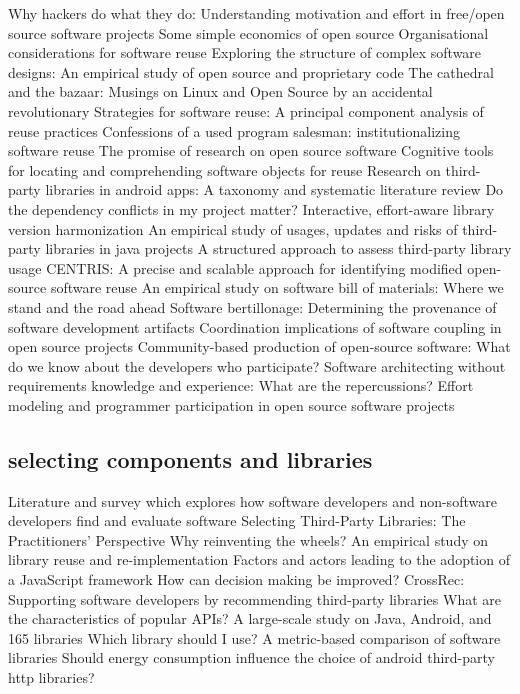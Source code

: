 \citep{Lakhani2003} Why hackers do what they do: Understanding motivation and effort in free/open source software projects
\citep{Lerner2002} Some simple economics of open source
\citep{Lynex1998} Organisational considerations for software reuse
\citep{MacCormack2006} Exploring the structure of complex software designs: An empirical study of open source and proprietary code
\citep{Raymond1999} The cathedral and the bazaar: Musings on Linux and Open Source by an accidental revolutionary
\citep{Rothenberger2003} Strategies for software reuse: A principal component analysis of reuse practices
\citep{Tracz1995} Confessions of a used program salesman: institutionalizing software reuse
\citep{VonKrogh2006} The promise of research on open source software
\citep{Fischer1991} Cognitive tools for locating and comprehending software objects for reuse
\citep{Zhan2021} Research on third-party libraries in android apps: A taxonomy and systematic literature review
\citep{Wang2018} Do the dependency conflicts in my project matter?
\citep{Huang2020} Interactive, effort-aware library version harmonization
\citep{Wang2020} An empirical study of usages, updates and risks of third-party libraries in java projects
\citep{Bauer2012} A structured approach to assess third-party library usage
\citep{Woo2021} CENTRIS: A precise and scalable approach for identifying modified open-source software reuse
\citep{Xia2023} An empirical study on software bill of materials: Where we stand and the road ahead
\citep{Davies2013} Software bertillonage: Determining the provenance of software development artifacts
\citep{Amrit2010} Coordination implications of software coupling in open source projects
\citep{David2008} Community-based production of open-source software: What do we know about the developers who participate?
\citep{Ferrari2008} Software architecting without requirements knowledge and experience: What are the repercussions?
\citep{Koch2008} Effort modeling and programmer participation in open source software projects

\subsection{selecting components and libraries}

\citep{Hucka2018} Literature and survey which explores how software developers and non-software developers find and evaluate software
\citep{LariosVargas2020} Selecting Third-Party Libraries: The Practitioners’ Perspective
\citep{Xu2020} Why reinventing the wheels? An empirical study on library reuse and re-implementation
\citep{Pano2018} Factors and actors leading to the adoption of a JavaScript framework
\citep{Milkman2009} How can decision making be improved?
\citep{Nguyen2020} CrossRec: Supporting software developers by recommending third-party libraries
\citep{Lima2020} What are the characteristics of popular APIs? A large-scale study on Java, Android, and 165 libraries
\citep{delaMora2018a} Which library should I use? A metric-based comparison of software libraries
\citep{Anwar2020} Should energy consumption influence the choice of android third-party http libraries?


